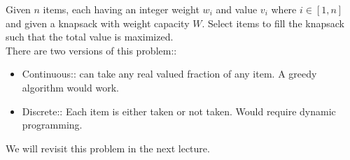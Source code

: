 \documentclass[12pt]{book}
\begin{document}
Given $n$ items, each having an integer weight $w_i$ and value $v_i$ where $i\in [1,n]$ and given a knapsack with weight capacity $W$. Select items to fill the knapsack such that the total value is maximized.\\

There are two versions of this problem::

\begin{itemize}
    \item Continuous:: can take any real valued fraction of any item. A greedy algorithm would work.
    \item Discrete:: Each item is either taken or not taken. Would require dynamic programming.
\end{itemize}

We will revisit this problem in the next lecture.
\end{document}
